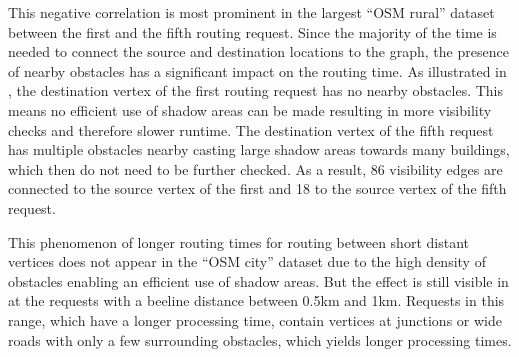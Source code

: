 			This negative correlation is most prominent in the largest \enquote{OSM rural} dataset between the first and the fifth routing request.
			Since the majority of the time is needed to connect the source and destination locations to the graph, the presence of nearby obstacles has a significant impact on the routing time.
			As illustrated in , the destination vertex of the first routing request has no nearby obstacles.
			This means no efficient use of shadow areas can be made resulting in more visibility checks and therefore slower runtime.
			The destination vertex of the fifth request has multiple obstacles nearby casting large shadow areas towards many buildings, which then do not need to be further checked.
			As a result, 86 visibility edges are connected to the source vertex of the first and 18 to the source vertex of the fifth request.
			
			This phenomenon of longer routing times for routing between short distant vertices does not appear in the \enquote{OSM city} dataset due to the high density of obstacles enabling an efficient use of shadow areas.
			But the effect is still visible in  at the requests with a beeline distance between 0.5km and 1km.
			Requests in this range, which have a longer processing time, contain vertices at junctions or wide roads with only a few surrounding obstacles, which yields longer processing times.
			
